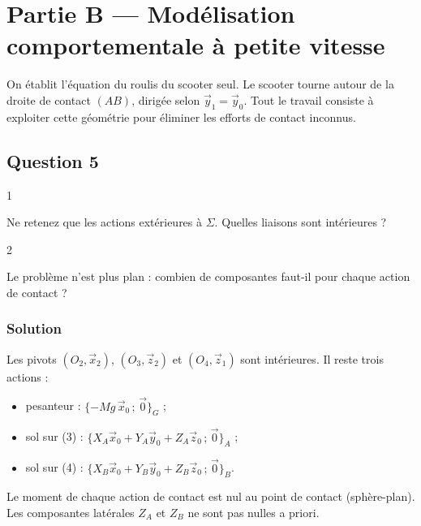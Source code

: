 \documentclass[11pt,a4paper]{article}
\providecommand{\tightlist}{\setlength{\itemsep}{0pt}\setlength{\parskip}{0pt}}
\begin{document}
\hypertarget{partie-b-moduxe9lisation-comportementale-uxe0-petite-vitesse}{%
\section{Partie B --- Modélisation comportementale à petite vitesse}\label{partie-b-moduxe9lisation-comportementale-uxe0-petite-vitesse}}

On établit l'équation du roulis du scooter seul. Le scooter tourne autour de la droite de contact \((AB)\), dirigée selon \(\vec y_1=\vec y_0\). Tout le travail consiste à exploiter cette géométrie pour éliminer les efforts de contact inconnus.

\hypertarget{question-5}{%
\subsection{Question 5}\label{question-5}}

\begin{indication}{1}

Ne retenez que les actions extérieures à \(\Sigma\). Quelles liaisons sont intérieures ?

\end{indication}

\begin{indication}{2}

Le problème n'est plus plan : combien de composantes faut-il pour chaque action de contact ?

\end{indication}

\hypertarget{solution-4}{%
\subsubsection{Solution}\label{solution-4}}

Les pivots \((O_2,\vec x_2)\), \((O_3,\vec z_2)\) et \((O_4,\vec z_1)\) sont intérieures. Il reste trois actions :

\begin{itemize}
\tightlist
\item
  pesanteur : \(\{-Mg\,\vec x_0\,;\,\vec0\}_G\) ;
\item
  sol sur (3) : \(\{X_A\vec x_0+Y_A\vec y_0+Z_A\vec z_0\,;\,\vec0\}_A\) ;
\item
  sol sur (4) : \(\{X_B\vec x_0+Y_B\vec y_0+Z_B\vec z_0\,;\,\vec0\}_B\).
\end{itemize}

Le moment de chaque action de contact est nul au point de contact (sphère-plan). Les composantes latérales \(Z_A\) et \(Z_B\) ne sont pas nulles a priori.
\end{document}

